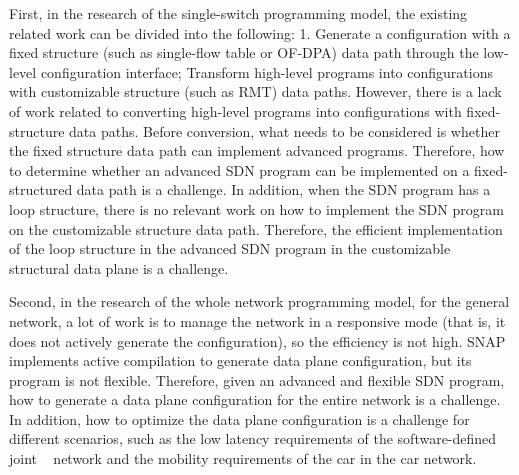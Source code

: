 \begin{eabstract}
First, in the research of the single-switch programming model, the existing related work can be divided into the following: 1. Generate a configuration with a fixed structure (such as single-flow table or OF-DPA) data path through the low-level configuration interface; Transform high-level programs into configurations with customizable structure (such as RMT) data paths. However, there is a lack of work related to converting high-level programs into configurations with fixed-structure data paths. Before conversion, what needs to be considered is whether the fixed structure data path can implement advanced programs. Therefore, how to determine whether an advanced SDN program can be implemented on a fixed-structured data path is a challenge. In addition, when the SDN program has a loop structure, there is no relevant work on how to implement the SDN program on the customizable structure data path. Therefore, the efficient implementation of the loop structure in the advanced SDN program in the customizable structural data plane is a challenge.

Second, in the research of the whole network programming model, for the general network, a lot of work is to manage the network in a responsive mode (that is, it does not actively generate the configuration), so the efficiency is not high. SNAP implements active compilation to generate data plane configuration, but its program is not flexible. Therefore, given an advanced and flexible SDN program, how to generate a data plane configuration for the entire network is a challenge. In addition, how to optimize the data plane configuration is a challenge for different scenarios, such as the low latency requirements of the software-defined joint ~\cite{mishra2017comparing} network and the mobility requirements of the car in the car network.

\end{eabstract}

